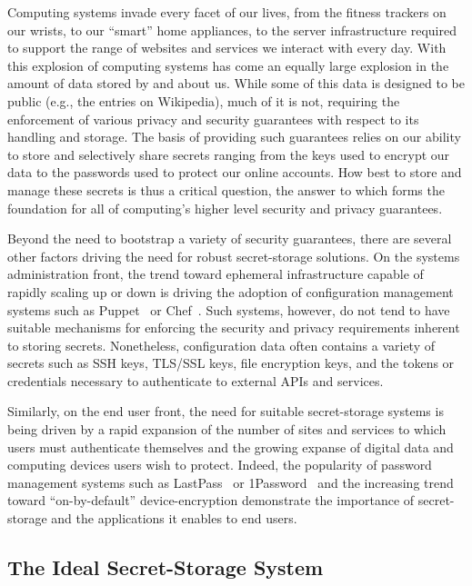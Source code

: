 Computing systems invade every facet of our lives, from the fitness
trackers on our wrists, to our ``smart'' home appliances, to the
server infrastructure required to support the range of websites and
services we interact with every day. With this explosion of computing
systems has come an equally large explosion in the amount of data
stored by and about us. While some of this data is designed to be
public (e.g., the entries on Wikipedia), much of it is not, requiring
the enforcement of various privacy and security guarantees with
respect to its handling and storage. The basis of providing such
guarantees relies on our ability to store and selectively share
secrets ranging from the keys used to encrypt our data to the
passwords used to protect our online accounts. How best to store and
manage these secrets is thus a critical question, the answer to which
forms the foundation for all of computing's higher level security and
privacy guarantees.

Beyond the need to bootstrap a variety of security guarantees, there
are several other factors driving the need for robust secret-storage
solutions. On the systems administration front, the trend toward
ephemeral infrastructure capable of rapidly scaling up or down is
driving the adoption of configuration management systems such as
Puppet~\cite{puppet} or Chef~\cite{chef}. Such systems, however, do
not tend to have suitable mechanisms for enforcing the security and
privacy requirements inherent to storing secrets. Nonetheless,
configuration data often contains a variety of secrets such as SSH
keys, TLS/SSL keys, file encryption keys, and the tokens or
credentials necessary to authenticate to external APIs and services.

Similarly, on the end user front, the need for suitable secret-storage
systems is being driven by a rapid expansion of the number of sites
and services to which users must authenticate themselves and the
growing expanse of digital data and computing devices users wish to
protect. Indeed, the popularity of password management systems such as
LastPass~\cite{lastpass} or 1Password~\cite{onepassword} and the
increasing trend toward ``on-by-default'' device-encryption
demonstrate the importance of secret-storage and the applications it
enables to end users.

\subsection{The Ideal Secret-Storage System}

